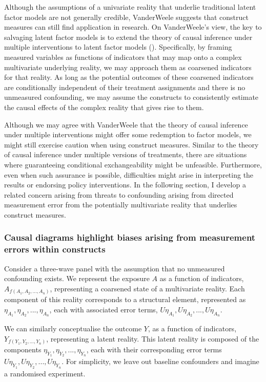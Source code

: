 \documentclass[
  singlecolumn]{article}
\begin{document}
Although the assumptions of a univariate reality that underlie
traditional latent factor models are not generally credible, VanderWeele
suggests that construct measures can still find application in research.
On VanderWeele's view, the key to salvaging latent factor models is to
extend the theory of causal inference under multiple interventions to
latent factor models ().
Specifically, by framing measured variables as functions of indicators
that may map onto a complex multivariate underlying reality, we may
approach them as coarsened indicators for that reality. As long as the
potential outcomes of these coarsened indicators are conditionally
independent of their treatment assignments and there is no unmeasured
confounding, we may assume the constructs to consistently estimate the
causal effects of the complex reality that gives rise to them.

Although we may agree with VanderWeele that the theory of causal
inference under multiple interventions might offer some redemption to
factor models, we might still exercise caution when using construct
measures. Similar to the theory of causal inference under multiple
versions of treatments, there are situations where guaranteeing
conditional exchangeability might be unfeasible. Furthermore, even when
such assurance is possible, difficulties might arise in interpreting the
results or endorsing policy interventions. In the following section, I
develop a related concern arising from threats to confounding arising
from directed measurement error from the potentially multivariate
reality that underlies construct measures.

\subsubsection{Causal diagrams highlight biases arising from measurement
errors within
constructs}\label{causal-diagrams-highlight-biases-arising-from-measurement-errors-within-constructs}

Consider a three-wave panel with the assumption that no unmeasured
confounding exists. We represent the exposure \(A\) as a function of
indicators, \(A_{f(A_1, A_2, ..., A_n)}\), representing a coarsened
state of a multivariate reality. Each component of this reality
corresponds to a structural element, represented as
\(\eta_{A_1}, \eta_{A_2}, ..., \eta_{A_n}\), each with associated error
terms, \(U\eta_{A_1}, U\eta_{A_2}, ..., U\eta_{A_n}\).

We can similarly conceptualise the outcome \(Y\), as a function of
indicators, \(Y_{f(Y_1, Y_2, ..., Y_n)}\), representing a latent
reality. This latent reality is composed of the components
\(\eta_{Y_1}, \eta_{Y_2}, ..., \eta_{Y_n}\), each with their
corresponding error terms
\(U\eta_{Y_1}, U\eta_{Y_2}, ..., U\eta_{Y_n}\). For simplicity, we leave
out baseline confounders and imagine a randomised experiment.
\end{document}
